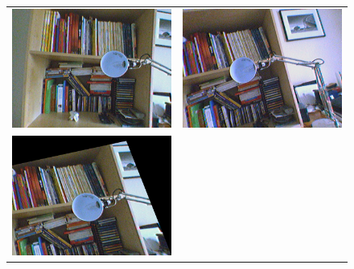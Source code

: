 \documentclass[11pt]{report}
\begin{document}
\begin{figure}[H]
\begin{tabular}{cc}
\includegraphics[scale=0.25]{images/unaligned_left.png} &
\includegraphics[scale=0.25]{images/unaligned_right.png} \\
\includegraphics[scale=0.25]{images/aligned_left.png} &

\end{tabular}
\end{figure}
\end{document}
